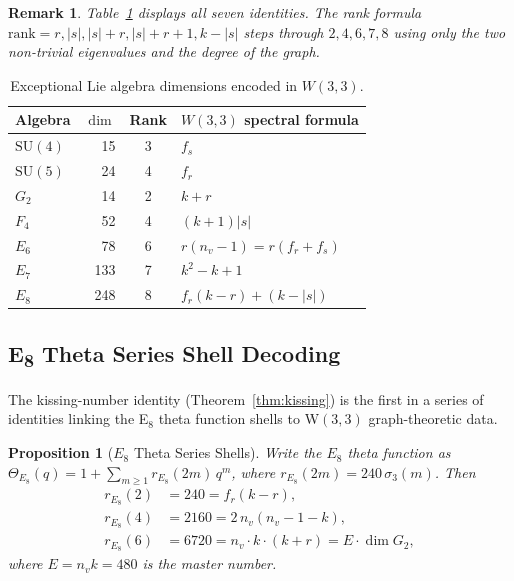 \documentclass[12pt,a4paper]{article}
\newtheorem{proposition}[theorem]{Proposition}
\newtheorem{remark}[theorem]{Remark}
\newcommand{\nv}{n_{\!v}}
\newcommand{\fr}{f_{\!r}}
\newcommand{\fs}{f_{\!s}}
\begin{document}
\begin{remark}
Table~\ref{tab:liecascade} displays all seven identities.
The rank formula $\mathrm{rank}=r,|s|,|s|+r,|s|+r+1,k-|s|$
steps through $2,4,6,7,8$ using only the two non-trivial eigenvalues
and the degree of the graph.
\end{remark}

\begin{table}[H]
\centering
\caption{Exceptional Lie algebra dimensions encoded in $W(3,3)$.}
\label{tab:liecascade}
\renewcommand{\arraystretch}{1.25}
\begin{tabular}{@{}lrcl@{}}
\toprule
Algebra & $\dim$ & Rank & $W(3,3)$ spectral formula \\
\midrule
$\mathrm{SU}(4)$ & 15 & 3 & $\fs$ \\
$\mathrm{SU}(5)$ & 24 & 4 & $\fr$ \\
$G_2$            & 14 & 2 & $k+r$ \\
$F_4$            & 52 & 4 & $(k+1)|s|$ \\
$E_6$            & 78 & 6 & $r(\nv-1)=r(\fr+\fs)$ \\
$E_7$            & 133 & 7 & $k^2-k+1$ \\
$E_8$            & 248 & 8 & $\fr(k-r)+(k-|s|)$ \\
\bottomrule
\end{tabular}
\end{table}

\subsection{E\protect\textsubscript{8} Theta Series Shell Decoding}

The kissing-number identity (Theorem~\ref{thm:kissing}) is the
first in a series of identities linking the E$_8$ theta function
shells to W$(3,3)$ graph-theoretic data.

\begin{proposition}[$E_8$ Theta Series Shells]
\label{prop:e8shells}
Write the $E_8$ theta function as
$\Theta_{E_8}(q)=1+\sum_{m\ge 1}r_{E_8}(2m)\,q^m$,
where $r_{E_8}(2m)=240\,\sigma_3(m)$.  Then
\begin{align}
  r_{E_8}(2) &= 240 = \fr(k-r), \label{eq:shell1}\\
  r_{E_8}(4) &= 2160 = 2\,\nv(\nv-1-k), \label{eq:shell2}\\
  r_{E_8}(6) &= 6720 = \nv\cdot k\cdot(k+r) = E\cdot\dim G_2, \label{eq:shell3}
\end{align}
where $E=\nv k=480$ is the master number.
\end{proposition}
\end{document}
